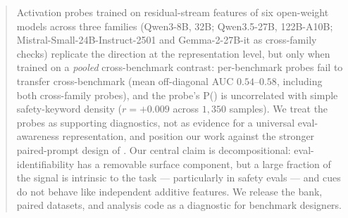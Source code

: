 \documentclass[11pt]{article}
\newcommand{\Peval}{P(\text{eval})}
\begin{document}
\begin{abstract}
Activation probes trained on residual-stream features of six open-weight
models across three families (Qwen3-8B, 32B; Qwen3.5-27B, 122B-A10B;
Mistral-Small-24B-Instruct-2501 and Gemma-2-27B-it as cross-family
checks) replicate the direction at the representation level, but only
when trained on a \emph{pooled} cross-benchmark contrast: per-benchmark
probes fail to transfer cross-benchmark (mean off-diagonal AUC
$0.54$--$0.58$, including both cross-family probes), and the probe's
\Peval{} is uncorrelated with simple safety-keyword density
($r{=}+0.009$ across $1{,}350$ samples). We treat the probes as supporting diagnostics,
not as evidence for a universal eval-awareness representation, and
position our work against the stronger paired-prompt design of
\citet{abdelnabi2025hawthorne}. Our central claim is decompositional:
eval-identifiability has a removable surface component, but a large
fraction of the signal is intrinsic to the task --- particularly in
safety evals --- and cues do not behave like independent additive
features. We release the bank, paired datasets, and analysis code as a
diagnostic for benchmark designers.
\end{abstract}
\end{document}
